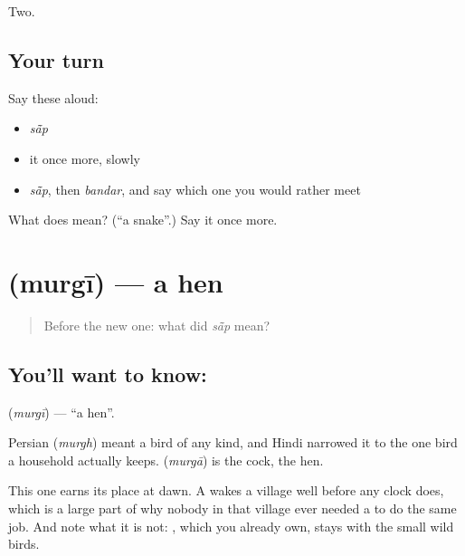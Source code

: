 \begin{grammarlens}[title={What you've built}]
Two.
\end{grammarlens}

\subsection*{Your turn}
Say these aloud:

\begin{itemize}
\raggedright
  \item \emph{sā̃p}
  \item it once more, slowly
  \item \emph{sā̃p}, then \emph{bandar}, and say which one you would rather meet
\end{itemize}

\begin{tcolorbox}[breakable,colback=teal!4,colframe=teal!35!black,title={Before you move on}]
What does  mean? (\textquotedblleft{}a snake\textquotedblright{}.) Say it once more.
\end{tcolorbox}
\section[\texorpdfstring{\hi{मुर्गी} (murgī)}{मुर्गी (murgī)}]{ (murgī) — a hen}

\label{lesson:HI-C60-hen}



\begin{quote}
Before the new one: what did \emph{sā̃p} mean?
\end{quote}

\subsection*{You'll want to know: }
\textbf{} (\emph{murgī}) — \textquotedblleft{}a hen\textquotedblright{}.

Persian  (\emph{murgh}) meant a bird of any kind, and Hindi narrowed it to the one bird a household actually keeps.  (\emph{murgā}) is the cock,  the hen.

This one earns its place at dawn. A  wakes a village well before any clock does, which is a large part of why nobody in that village ever needed a  to do the same job. And note what it is not: , which you already own, stays with the small wild birds.

